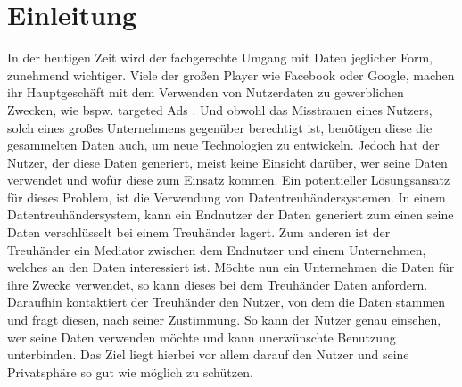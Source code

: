 \documentclass[11pt,a4paper]{scrreprt}
\begin{document}
\chapter{Einleitung}
In der heutigen Zeit wird der fachgerechte Umgang mit Daten jeglicher Form, zunehmend wichtiger. Viele der großen Player wie Facebook oder Google, machen ihr Hauptgeschäft mit dem Verwenden von Nutzerdaten zu gewerblichen Zwecken, wie bspw. targeted Ads \cite{facebookad} \cite{googlead}. Und obwohl das Misstrauen eines Nutzers, solch eines großes Unternehmens gegenüber berechtigt ist, benötigen diese die gesammelten Daten auch, um neue Technologien zu entwickeln. Jedoch hat der Nutzer, der diese Daten generiert, meist keine Einsicht darüber, wer seine Daten verwendet und wofür diese zum Einsatz kommen. Ein potentieller Lösungsansatz für dieses Problem, ist die Verwendung von Datentreuhändersystemen. In einem Datentreuhändersystem, kann ein Endnutzer der Daten generiert zum einen seine Daten verschlüsselt bei einem Treuhänder lagert. Zum anderen ist der Treuhänder ein Mediator zwischen dem Endnutzer und einem Unternehmen, welches an den Daten interessiert ist. Möchte nun ein Unternehmen die Daten für ihre Zwecke verwendet, so kann dieses bei dem Treuhänder Daten anfordern. Daraufhin kontaktiert der Treuhänder den Nutzer, von dem die Daten stammen und fragt diesen, nach seiner Zustimmung. So kann der Nutzer genau einsehen, wer seine Daten verwenden möchte und kann unerwünschte Benutzung unterbinden. Das Ziel liegt hierbei vor allem darauf den Nutzer und seine Privatsphäre so gut wie möglich zu schützen.
\end{document}
